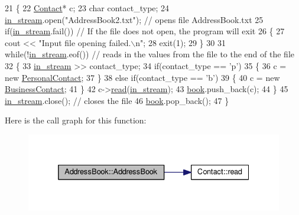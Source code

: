 \begin{DoxyCode}
21 \{
22    \hyperlink{classContact}{Contact}* c;
23    \textcolor{keywordtype}{char} contact\_type;
24    \hyperlink{AddressBook_8cpp_addb74eb46f4ea2191b74ab5c2a3adb30}{in\_stream}.open(\textcolor{stringliteral}{"AddressBook2.txt"}); \textcolor{comment}{// opens file AddressBook.txt                              
                                                                                                                }
25    \textcolor{keywordflow}{if}(\hyperlink{AddressBook_8cpp_addb74eb46f4ea2191b74ab5c2a3adb30}{in\_stream}.fail()) \textcolor{comment}{// If the file does not open, the program will exit                       
                                                                                                                }
26    \{
27       cout << \textcolor{stringliteral}{"Input file opening failed.\(\backslash\)n"};
28       exit(1);
29    \}
30 
31    \textcolor{keywordflow}{while}(!\hyperlink{AddressBook_8cpp_addb74eb46f4ea2191b74ab5c2a3adb30}{in\_stream}.eof()) \textcolor{comment}{// reads in the values from the file to the end of the file            
                                                                                                                }
32    \{
33       \hyperlink{AddressBook_8cpp_addb74eb46f4ea2191b74ab5c2a3adb30}{in\_stream} >> contact\_type;
34       \textcolor{keywordflow}{if}(contact\_type == \textcolor{charliteral}{'p'})
35       \{
36          c = \textcolor{keyword}{new} \hyperlink{classPersonalContact}{PersonalContact};
37       \}
38       \textcolor{keywordflow}{else} \textcolor{keywordflow}{if}(contact\_type == \textcolor{charliteral}{'b'})
39       \{
40          c = \textcolor{keyword}{new} \hyperlink{classBusinessContact}{BusinessContact};
41       \}
42       c->\hyperlink{classContact_a129d7132ff55adf52737ca7e364d6420}{read}(\hyperlink{AddressBook_8cpp_addb74eb46f4ea2191b74ab5c2a3adb30}{in\_stream});
43       \hyperlink{classAddressBook_a2a42a2a0314d0b2c788834caf03b452e}{book}.push\_back(c);
44    \}
45    \hyperlink{AddressBook_8cpp_addb74eb46f4ea2191b74ab5c2a3adb30}{in\_stream}.close(); \textcolor{comment}{// closes the file                                                          
                                                                                                                }
46    \hyperlink{classAddressBook_a2a42a2a0314d0b2c788834caf03b452e}{book}.pop\_back();
47 \}
\end{DoxyCode}


Here is the call graph for this function\+:
\nopagebreak
\begin{figure}[H]
\begin{center}
\leavevmode
\includegraphics[width=332pt]{classAddressBook_ad2d2cebd2a3aa00130f769684bc8ddea_cgraph}
\end{center}
\end{figure}


